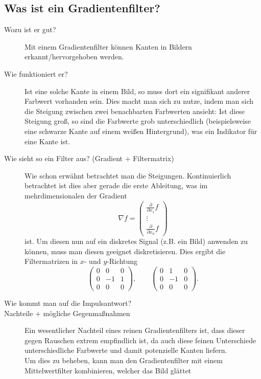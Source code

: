 \subsection{Was ist ein Gradientenfilter?}
\begin{description}
	\item[Wozu ist er gut?]
      Mit einem Gradientenfilter können Kanten in Bildern erkannt/hervorgehoben werden.
	\item[Wie funktioniert er?]
      Ist eine solche Kante in einem Bild, so muss dort ein signifikant anderer Farbwert
      vorhanden sein. Dies macht man sich zu nutze, indem man sich die Steigung zwischen
      zwei benachbarten Farbwerten ansieht: Ist diese Steigung groß, so sind die Farbwerte
      grob unterschiedlich (beispielsweise eine schwarze Kante auf einem weißen Hintergrund),
      was ein Indikator für eine Kante ist.
	\item[Wie sieht so ein Filter aus? (Gradient + Filtermatrix)]
      Wie schon erwähnt betrachtet man die Steigungen. Kontinuierlich betrachtet ist dies
      aber gerade die erste Ableitung, was im mehrdimensionalen der Gradient
      $$ \nabla f = \begin{pmatrix} \frac{\partial}{\partial x_1}f\\ \vdots\\ \frac{\partial}{\partial x_n}f \end{pmatrix} $$
      ist. Um diesen nun auf ein diskretes Signal (z.B. ein Bild) anwenden zu können, muss
      man diesen geeignet diskretisieren. Dies ergibt die Filtermatrizen in $x$- und $y$-Richtung
      $$ \begin{pmatrix}0&0&0\\0&-1&1\\0&0&0\end{pmatrix},\qquad\begin{pmatrix}0&1&0\\0&-1&0\\0&0&0\end{pmatrix}. $$
	\item[Wie kommt man auf die Impulsantwort?]
	\item[Nachteile + mögliche Gegenmaßnahmen]
      Ein wesentlicher Nachteil eines reinen Gradientenfilters ist, dass dieser gegen Rauschen extrem empfindlich ist, da
      auch diese feinen Unterschiede unterschiedliche Farbwerte und damit potenzielle Kanten liefern.\\
      Um dies zu beheben, kann man den Gradientenfilter mit einem Mittelwertfilter kombinieren, welcher das Bild glättet 

\end{description}
